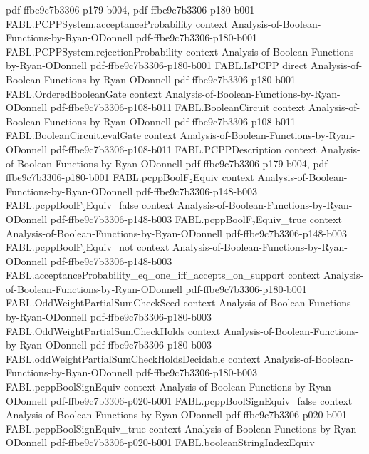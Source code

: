 \begin{theorem}
  {pdf-ffbe9c7b3306-p179-b004,
    pdf-ffbe9c7b3306-p180-b001}
\proofstep
  {FABL.PCPPSystem.acceptanceProbability}
  {context}
  {Analysis-of-Boolean-Functions-by-Ryan-ODonnell}
  {pdf-ffbe9c7b3306-p180-b001}
\proofstep
  {FABL.PCPPSystem.rejectionProbability}
  {context}
  {Analysis-of-Boolean-Functions-by-Ryan-ODonnell}
  {pdf-ffbe9c7b3306-p180-b001}
\proofstep
  {FABL.IsPCPP}
  {direct}
  {Analysis-of-Boolean-Functions-by-Ryan-ODonnell}
  {pdf-ffbe9c7b3306-p180-b001}
\proofstep
  {FABL.OrderedBooleanGate}
  {context}
  {Analysis-of-Boolean-Functions-by-Ryan-ODonnell}
  {pdf-ffbe9c7b3306-p108-b011}
\proofstep
  {FABL.BooleanCircuit}
  {context}
  {Analysis-of-Boolean-Functions-by-Ryan-ODonnell}
  {pdf-ffbe9c7b3306-p108-b011}
\proofstep
  {FABL.BooleanCircuit.evalGate}
  {context}
  {Analysis-of-Boolean-Functions-by-Ryan-ODonnell}
  {pdf-ffbe9c7b3306-p108-b011}
\proofstep
  {FABL.PCPPDescription}
  {context}
  {Analysis-of-Boolean-Functions-by-Ryan-ODonnell}
  {pdf-ffbe9c7b3306-p179-b004,
    pdf-ffbe9c7b3306-p180-b001}
\proofstep
  {FABL.pcppBoolF₂Equiv}
  {context}
  {Analysis-of-Boolean-Functions-by-Ryan-ODonnell}
  {pdf-ffbe9c7b3306-p148-b003}
\proofstep
  {FABL.pcppBoolF₂Equiv_false}
  {context}
  {Analysis-of-Boolean-Functions-by-Ryan-ODonnell}
  {pdf-ffbe9c7b3306-p148-b003}
\proofstep
  {FABL.pcppBoolF₂Equiv_true}
  {context}
  {Analysis-of-Boolean-Functions-by-Ryan-ODonnell}
  {pdf-ffbe9c7b3306-p148-b003}
\proofstep
  {FABL.pcppBoolF₂Equiv_not}
  {context}
  {Analysis-of-Boolean-Functions-by-Ryan-ODonnell}
  {pdf-ffbe9c7b3306-p148-b003}
\proofstep
  {FABL.acceptanceProbability_eq_one_iff_accepts_on_support}
  {context}
  {Analysis-of-Boolean-Functions-by-Ryan-ODonnell}
  {pdf-ffbe9c7b3306-p180-b001}
\proofstep
  {FABL.OddWeightPartialSumCheckSeed}
  {context}
  {Analysis-of-Boolean-Functions-by-Ryan-ODonnell}
  {pdf-ffbe9c7b3306-p180-b003}
\proofstep
  {FABL.OddWeightPartialSumCheckHolds}
  {context}
  {Analysis-of-Boolean-Functions-by-Ryan-ODonnell}
  {pdf-ffbe9c7b3306-p180-b003}
\proofstep
  {FABL.oddWeightPartialSumCheckHoldsDecidable}
  {context}
  {Analysis-of-Boolean-Functions-by-Ryan-ODonnell}
  {pdf-ffbe9c7b3306-p180-b003}
\proofstep
  {FABL.pcppBoolSignEquiv}
  {context}
  {Analysis-of-Boolean-Functions-by-Ryan-ODonnell}
  {pdf-ffbe9c7b3306-p020-b001}
\proofstep
  {FABL.pcppBoolSignEquiv_false}
  {context}
  {Analysis-of-Boolean-Functions-by-Ryan-ODonnell}
  {pdf-ffbe9c7b3306-p020-b001}
\proofstep
  {FABL.pcppBoolSignEquiv_true}
  {context}
  {Analysis-of-Boolean-Functions-by-Ryan-ODonnell}
  {pdf-ffbe9c7b3306-p020-b001}
\proofstep
  {FABL.booleanStringIndexEquiv}

\end{theorem}
